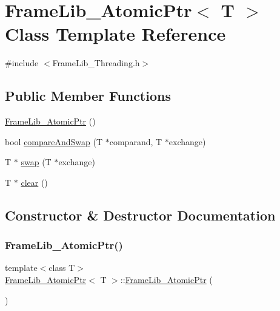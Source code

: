 \hypertarget{class_frame_lib___atomic_ptr}{}\section{Frame\+Lib\+\_\+\+Atomic\+Ptr$<$ T $>$ Class Template Reference}
\label{class_frame_lib___atomic_ptr}


{\ttfamily \#include $<$Frame\+Lib\+\_\+\+Threading.\+h$>$}

\subsection*{Public Member Functions}
\begin{DoxyCompactItemize}
\item 
\hyperlink{class_frame_lib___atomic_ptr_a42e760fcef9c2bf28dce2a736c9d045f}{Frame\+Lib\+\_\+\+Atomic\+Ptr} ()
\item 
bool \hyperlink{class_frame_lib___atomic_ptr_aa7f7707b2cd08a5fd63e8f8de734a80c}{compare\+And\+Swap} (T $\ast$comparand, T $\ast$exchange)
\item 
T $\ast$ \hyperlink{class_frame_lib___atomic_ptr_ac02b692707a1f309c4d1358d08156390}{swap} (T $\ast$exchange)
\item 
T $\ast$ \hyperlink{class_frame_lib___atomic_ptr_a03090a00c9c4a38a7ae1399854532752}{clear} ()
\end{DoxyCompactItemize}


\subsection{Constructor \& Destructor Documentation}
\mbox{\label{class_frame_lib___atomic_ptr_a42e760fcef9c2bf28dce2a736c9d045f}} 
\subsubsection{\texorpdfstring{Frame\+Lib\+\_\+\+Atomic\+Ptr()}{FrameLib\_AtomicPtr()}}
{\footnotesize\ttfamily template$<$class T$>$ \\
\hyperlink{class_frame_lib___atomic_ptr}{Frame\+Lib\+\_\+\+Atomic\+Ptr}$<$ T $>$\+::\hyperlink{class_frame_lib___atomic_ptr}{Frame\+Lib\+\_\+\+Atomic\+Ptr} (\begin{DoxyParamCaption}{ }\end{DoxyParamCaption})\hspace{0.3cm}{\ttfamily [inline]}}



